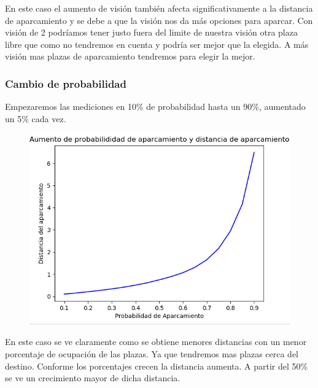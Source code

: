 \documentclass[]{article}
\begin{document}
En este caso el aumento de visión también afecta significativamente a la distancia de aparcamiento y se debe a que la visión nos da más opciones para aparcar. Con visión de 2 podríamos tener justo fuera del limite de nuestra visión otra plaza libre que como no tendremos en cuenta y podría ser mejor que la elegida. A más visión mas plazas de aparcamiento tendremos para elegir la mejor.





\subsubsection{Cambio de probabilidad}

Empezaremos las mediciones en 10\% de probabilidad hasta un 90\%, aumentado un 5\% cada vez.

\begin{figure}[H]
	\centering
	\includegraphics[width=1\linewidth]{img/screenshot014}
	\label{fig:screenshot014}
\end{figure}

En este caso se ve claramente como se obtiene menores distancias con un menor porcentaje de ocupación de las plazas. Ya que tendremos mas plazas cerca del destino. Conforme los porcentajes crecen la distancia aumenta. A partir del 50\% se ve un crecimiento mayor de dicha distancia. 
\end{document}
